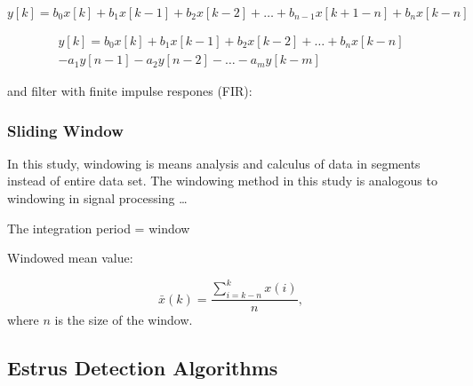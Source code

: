 \documentclass[english,12pt,a4paper,pdftex,elec,utf8]{aaltothesis}
\begin{document}


\begin{equation}
y[k] = b_0 x[k] + b_1 x[k-1] + b_2 x[k-2] + \dots + b_{n-1} x[k+1-n] + b_n x[k-n]
\end{equation}\label{firequation}



\begin{equation}
\begin{aligned}
y[k] = b_0 x[k] + b_1 x[k-1] + b_2 x[k-2] + \dots + b_n x[k-n] \\
-a_1 y[n-1] - a_2 y[n-2] - \dots - a_m y[k-m]
\end{aligned}
\end{equation}\label{iirequation}


and filter with finite impulse respones (FIR):






\subsubsection{Sliding Window} \label{slidingwindowsection}

In this study, windowing is means analysis and calculus of data in segments instead of entire data set. The windowing method in this study is analogous to windowing in signal processing \cite{tan2007digital,miao2007signal} \dots 

The integration period = window

Windowed mean value:

\begin{equation}
\bar{x}(k) = \frac{ \sum\limits^{k}_{i = k - n} x(i)}{n} \mathrm{,}
\end{equation} where $n$ is the size of the window.


\subsection{Estrus Detection Algorithms} \label{estrusdetectionalgorithmssection}
\end{document}
